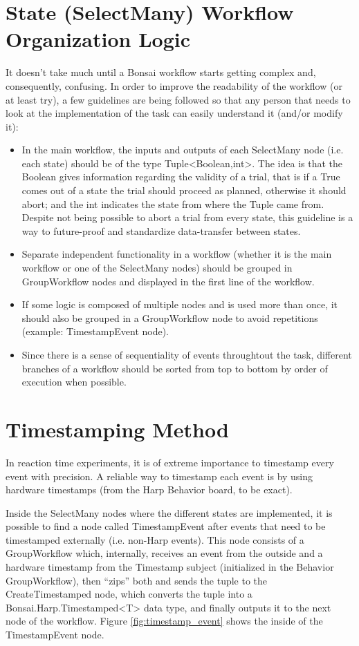 \section{State (SelectMany) Workflow Organization Logic}
\label{sec:state_organization}
It doesn't take much until a Bonsai workflow starts getting complex and, consequently, confusing. In order to improve the readability of the workflow (or at least try), a few guidelines are being followed so that any person that needs to look at the implementation of the task can easily understand it (and/or modify it):
\begin{itemize}
    \item In the main workflow, the inputs and outputs of each SelectMany node (i.e. each state) should be of the type Tuple<Boolean,int>. The idea is that the Boolean gives information regarding the validity of a trial, that is if a True comes out of a state the trial should proceed as planned, otherwise it should abort; and the int indicates the state from where the Tuple came from. Despite not being possible to abort a trial from every state, this guideline is a way to future-proof and standardize data-transfer between states.
    \item Separate independent functionality in a workflow (whether it is the main workflow or one of the SelectMany nodes) should be grouped in GroupWorkflow nodes and displayed in the first line of the workflow.
    \item If some logic is composed of multiple nodes and is used more than once, it should also be grouped in a GroupWorkflow node to avoid repetitions (example: TimestampEvent node).
    \item Since there is a sense of sequentiality of events throughtout the task, different branches of a workflow should be sorted from top to bottom by order of execution when possible.
\end{itemize}

\section{Timestamping Method}
\label{sec:timestamping}
In reaction time experiments, it is of extreme importance to timestamp every event with precision. A reliable way to timestamp each event is by using hardware timestamps (from the Harp Behavior board, to be exact).

Inside the SelectMany nodes where the different states are implemented, it is possible to find a node called TimestampEvent after events that need to be timestamped externally (i.e. non-Harp events). This node consists of a GroupWorkflow which, internally, receives an event from the outside and a hardware timestamp from the Timestamp subject (initialized in the Behavior GroupWorkflow), then ``zips'' both and sends the tuple to the CreateTimestamped node, which converts the tuple into a Bonsai.Harp.Timestamped<T> data type, and finally outputs it to the next node of the workflow. Figure \ref{fig:timestamp_event} shows the inside of the TimestampEvent node.

